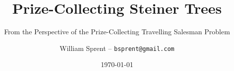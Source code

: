 \documentclass[12pt, a4paper]{report}
\title{Prize-Collecting Steiner Trees}
\author{William Sprent -- \texttt{bsprent@gmail.com}}
\subtitle{From the Perspective of the Prize-Collecting Travelling Salesman Problem}
\date{\today}
\begin{document}
\maketitle
~
\begin{abstract}
  
\end{abstract}

\tableofcontents
\clearpage










\end{document}

